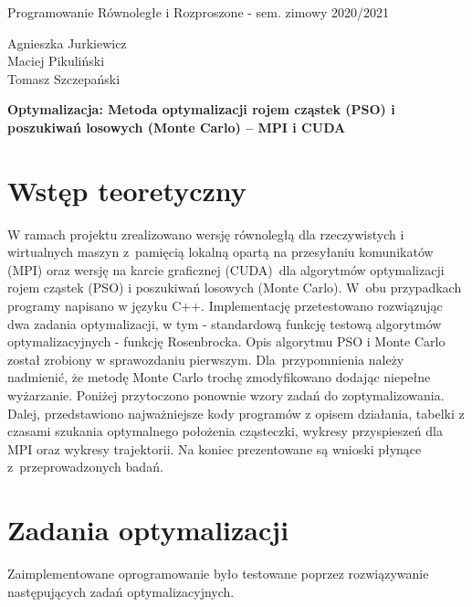 \documentclass[11pt, a4paper, oneside]{article}
\begin{document}
\hspace*{-\parindent}%
\begin{minipage}{\textwidth}
  \begin{minipage}{.7\textwidth}
   \begin{flushleft}
	Programowanie Równoległe i Rozproszone - sem. zimowy 2020/2021
	\end{flushleft}
  \end{minipage}
  \begin{minipage}{.3\textwidth}
    \begin{flushright}
	Agnieszka Jurkiewicz \\
	Maciej Pikuliński \\
	Tomasz Szczepański
	\end{flushright}
  \end{minipage}%
\end{minipage}
\begin{center}
{\Large \textbf{Optymalizacja: Metoda optymalizacji rojem cząstek (PSO) i poszukiwań losowych (Monte Carlo) -- MPI i CUDA}}
\end{center}


\section{Wstęp teoretyczny}
 
W ramach projektu zrealizowano wersję równoległą dla rzeczywistych i wirtualnych maszyn z~pamięcią lokalną opartą na przesyłaniu komunikatów (MPI) oraz wersję na karcie graficznej (CUDA)~dla algorytmów optymalizacji rojem cząstek (PSO) i poszukiwań losowych (Monte Carlo). W~obu przypadkach programy napisano w języku C++. Implementację przetestowano rozwiązując dwa zadania optymalizacji, w tym - standardową funkcję testową algorytmów optymalizacyjnych - funkcję Rosenbrocka. Opis algorytmu PSO i Monte Carlo został zrobiony w sprawozdaniu pierwszym. Dla~przypomnienia należy nadmienić, że metodę Monte Carlo trochę zmodyfikowano dodając niepełne wyżarzanie. Poniżej przytoczono ponownie wzory zadań do zoptymalizowania. Dalej, przedstawiono najważniejsze kody programów z opisem działania, tabelki z czasami szukania optymalnego położenia cząsteczki, wykresy przyspieszeń dla MPI oraz wykresy trajektorii. Na koniec prezentowane są wnioski płynące z~przeprowadzonych badań.


\section{Zadania optymalizacji}
Zaimplementowane oprogramowanie było testowane poprzez rozwiązywanie następujących zadań optymalizacyjnych.
\end{document}
